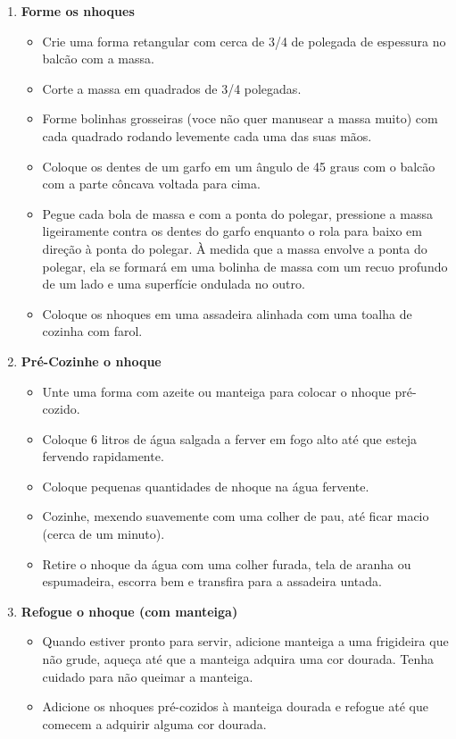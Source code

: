 \documentclass [11pt, letterpaper] {article}
\begin{document}
\begin {description}
\begin {enumerate}
\item {\bf Forme os nhoques}
\begin {itemize}
\item Crie uma forma retangular com cerca de 3/4 de polegada de espessura no balcão com a massa.
\item Corte a massa em quadrados de 3/4 polegadas.
\item Forme bolinhas grosseiras (voce n\~ao quer manusear a massa muito) com cada quadrado rodando levemente cada uma das suas mãos.
\item Coloque os dentes de um garfo em um ângulo de 45 graus com o balc\~ao com a parte côncava voltada para cima.
\item Pegue cada bola de massa e com a ponta do polegar, pressione a massa ligeiramente contra os dentes do garfo enquanto o rola para baixo em direção à ponta do polegar. À medida que a massa envolve a ponta do polegar, ela se formará em uma bolinha de massa com um recuo profundo de um lado e uma superfície ondulada no outro.
\item Coloque os nhoques em uma assadeira alinhada com uma toalha de cozinha com farol.
\end {itemize}
\item {\bf Pré-Cozinhe o nhoque}
\begin {itemize}
\item Unte uma forma com azeite ou manteiga para colocar o nhoque pré-cozido.
\item Coloque 6 litros de água salgada a ferver em fogo alto at\'e que esteja fervendo rapidamente.
\item Coloque pequenas quantidades de nhoque na água fervente.
\item Cozinhe, mexendo suavemente com uma colher de pau, até ficar macio (cerca de um minuto).
\item Retire o nhoque da água com uma colher furada, tela de aranha ou espumadeira, escorra bem e transfira para a assadeira untada.
\end {itemize}
\item {\bf Refogue o nhoque (com manteiga)}
\begin {itemize}
\item Quando estiver pronto para servir, adicione manteiga a uma frigideira que n\~ao grude, aqueça até que a manteiga adquira uma cor dourada. Tenha cuidado para não queimar a manteiga.
\item Adicione os nhoques pré-cozidos à manteiga dourada e refogue até que comecem a adquirir alguma cor dourada.

\end{itemize}
\end{enumerate}
\end{description}
\end{document}
